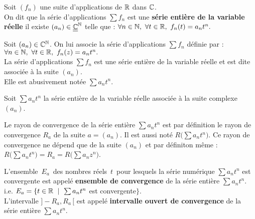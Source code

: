 \vspace{1.3cm}

Soit \((f_n)\) une suite d'applications de \(\mathbb{R}\) dans \(\mathbb{C}\).\vspace{0.1cm}\\
On dit que la série d'applications \(\sum f_n\) est une \textbf{série entière de la variable réelle} \ssi il existe \((a_n)\in \underline{\underline{\mathbb{C}}}^{\mathbb{N}}\) telle que : \(\forall n\in \NN,\ \forall t\in \RR,\ f_n(t)=a_nt^n.\)\vspace{0.3cm}\\
\begin{small}
    Soit \((a_n)\in \mathbb{C}^{\mathbb{N}}\). On lui associe la série d'applications \(\sum f_n\) définie par : \(\forall n \in \mathbb{N},\ \forall t\in \mathbb{R}, \ f_n(z)=a_nt^n.\)\\
     La série d'applications \(\sum f_n\) est une série entière de la variable réelle et est dite associée à la suite \((a_n)\). \\
     Elle est abusivement notée \(\sum a_nt^n\).    
\end{small}

\vspace{1.3cm}

Soit \(\sum a_nt^n\) la série entière de la variable réelle associée à la suite complexe \((a_n)\).\vspace{0.1cm}\\
\begin{small}
    Le rayon de convergence de la série entière \(\sum a_nt^n\) est par définition le rayon de convergence \(R_a\) de la suite \(a=(a_n)\). Il est aussi noté \(R\bigl(\sum a_nt^n\bigr)\). Ce rayon de convergence ne dépend que de la suite \((a_n)\) et par définiton même : \(R\bigl(\sum a_nt^n\bigr) = R_a = R\bigl(\sum a_nz^n\bigr)\).\vspace{0.2cm}\\
\end{small} 
L'ensemble \(\,E_a\,\) des nombres réels \(\,t\,\) pour lesquels la série numérique \(\sum a_nt^n\) est convergente est appelé \textbf{ensemble de convergence} de la série entière \(\sum a_nt^n\).\vspace{0.1cm}\\
i.e. \(E_a = \{ t\in \mathbb{R} \ \mid \ \sum a_nt^n\) est convergente$\}$.\vspace{0.2cm}\\
L'intervalle \(]-R_a,R_a\, [\) est appelé \textbf{intervalle ouvert de convergence} de la série entière \(\sum a_nt^n\).

